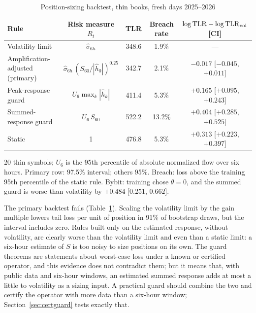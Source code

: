 \documentclass[12pt]{article}
\theoremstyle{definition}
\theoremstyle{remark}
\begin{document}
\begin{table}[t]\centering\small
\begin{threeparttable}
\caption{Position-sizing backtest, thin books, fresh days 2025--2026}\label{tab:backtest}
\begin{tabular}{lcccc}
\toprule
Rule & Risk measure $R_t$ & TLR & Breach rate & $\log{\rm TLR}-\log{\rm TLR}_{\rm vol}$ [CI]\\
\midrule
Volatility limit & $\hat\sigma_{6h}$ & 348.6 & 1.9\% & ---\\
Amplification-adjusted (primary) & $\hat\sigma_{6h}\,(S_{60}/|\hat h_0|)^{0.25}$ & 342.7 & 2.1\% & $-0.017$ [$-0.045$, $+0.011$]\\
Peak-response guard & $U_6\max_k|\hat h_k|$ & 411.4 & 5.3\% & $+0.165$ [$+0.095$, $+0.243$]\\
Summed-response guard & $U_6\,S_{60}$ & 522.2 & 13.2\% & $+0.404$ [$+0.285$, $+0.525$]\\
Static & 1 & 476.8 & 5.3\% & $+0.313$ [$+0.223$, $+0.397$]\\
\bottomrule
\end{tabular}
\begin{tablenotes}\footnotesize\item 20 thin symbols; $U_6$ is the 95th percentile of absolute normalized flow over six hours. Primary row: 97.5\% interval; others 95\%. Breach: loss above the training 95th percentile of the static rule. Bybit: training chose $\theta=0$, and the summed guard is worse than volatility by $+0.484$ [$0.251$, $0.662$]. \end{tablenotes}
\end{threeparttable}
\end{table}

The primary backtest fails (Table~\ref{tab:backtest}). Scaling the volatility limit by the gain multiple lowers tail loss per unit of position in 91\% of bootstrap draws, but the interval includes zero. Rules built only on the estimated response, without volatility, are clearly worse than the volatility limit and even than a static limit: a six-hour estimate of $S$ is too noisy to size positions on its own. The guard theorems are statements about worst-case loss under a known or certified operator, and this evidence does not contradict them; but it means that, with public data and six-hour windows, an estimated summed response adds at most a little to volatility as a sizing input. A practical guard should combine the two and certify the operator with more data than a six-hour window; Section~\ref{sec:certguard} tests exactly that.
\end{document}
